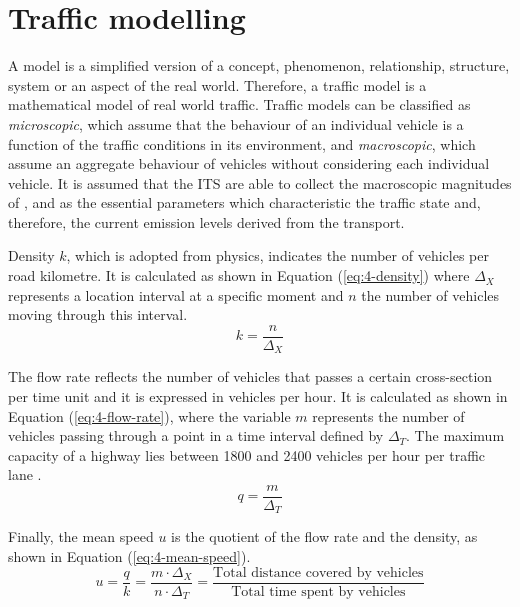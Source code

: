 \section{Traffic modelling}
A model is a simplified version of a concept, phenomenon, relationship, structure, system or an aspect of the real world. Therefore, a traffic model is a mathematical model of real world traffic. Traffic models can be classified as \textit{microscopic}, which assume that the behaviour of an individual vehicle is a function of the traffic conditions in its environment, and \textit{macroscopic}, which assume an aggregate behaviour of vehicles without considering each individual vehicle. It is assumed that the \ac{ITS} are able to collect the macroscopic magnitudes of ,  and  as the essential parameters which characteristic the traffic state and, therefore, the current emission levels derived from the transport.

Density $k$, which is adopted from physics, indicates the number of vehicles per road kilometre. It is calculated as shown in Equation (\ref{eq:4-density}) where ${ \Delta  }_{ X }$ represents a location interval at a specific moment and $n$ the number of vehicles moving through this interval.
\begin{equation} \label{eq:4-density}
k = \frac { n }{ { \Delta  }_{ X } } 
\end{equation}

The flow rate reflects the number of vehicles that passes a certain cross-section per time unit and it is expressed in vehicles per hour. It is calculated as shown in Equation (\ref{eq:4-flow-rate}), where the variable $m$ represents the number of vehicles passing through a point in a time interval defined by ${ \Delta  }_{ T }$. The maximum capacity of a highway lies between 1800 and 2400 vehicles per hour per traffic lane \cite{HCM2000}.
\begin{equation} \label{eq:4-flow-rate}
q = \frac { m }{ { \Delta  }_{ T } } 
\end{equation}

Finally, the mean speed $u$ is the quotient of the flow rate and the density, as shown in Equation (\ref{eq:4-mean-speed}).
\begin{equation} \label{eq:4-mean-speed}
u = \frac { q }{ k } = \frac{m \cdot {\Delta  }_{ X }}{n \cdot {\Delta  }_{ T }} = \frac { \text{Total  distance  covered  by  vehicles} }{ \text{Total  time  spent  by  vehicles} } 
\end{equation}

